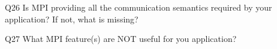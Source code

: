 \begin{description}%
\item{Q26} Is MPI providing all the communication semantics required by your application? If not, what is missing?%
\item{Q27} What MPI feature(s) are NOT useful for you application?%
\end{description}%
